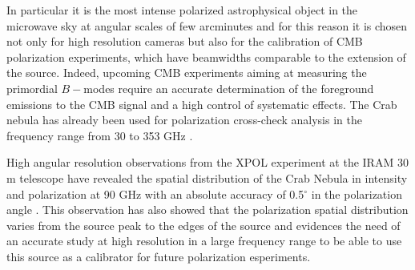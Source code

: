\documentclass[twocolumn,traditabstract]{aa}
\begin{document}
In particular it is the most intense polarized astrophysical object in the microwave sky
at angular scales of few arcminutes and for this reason it is chosen not only for high resolution cameras
but also for the calibration of
CMB polarization experiments, which have
beamwidths comparable to the extension of the source. 
Indeed, upcoming CMB experiments aiming at measuring the primordial $B-$modes require an accurate
determination of the foreground emissions to the CMB signal and a high control
of systematic effects.
The Crab nebula has already been used for polarization cross-check analysis in the frequency
range from 30 to 353 GHz \citep{2011ApJS..192...19W,2015arXiv150702058P}.

High angular resolution observations from the XPOL experiment \citep{thum2008} at the
IRAM 30 m telescope have revealed the spatial distribution of the Crab Nebula in
intensity and polarization at 90 GHz with an absolute accuracy of 0.5$^{\circ}$
in the polarization angle \citep{aumont2010}.
This observation has also showed that the polarization spatial distribution varies from the source peak
to the edges of the source and evidences the need of an accurate study at high resolution in a large frequency range to be able to use this source as a calibrator for future polarization esperiments.
\end{document}
